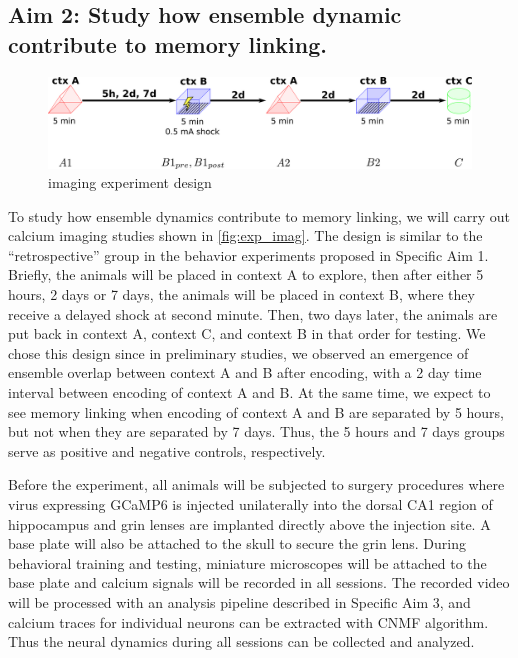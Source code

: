 \documentclass[master.tex]{subfiles}
\begin{document}
\subsection*{Aim 2: Study how ensemble dynamic contribute to memory linking.}

\begin{figure}[!hbt]
  \centering \includegraphics[scale = .135]{Figures/exp_imag.pdf}
  \caption{\footnotesize imaging experiment design}
  \label{fig:exp_imag}
\end{figure}

To study how ensemble dynamics contribute to memory linking, we will carry out
calcium imaging studies shown in \autoref{fig:exp_imag}. The design is similar
to the ``retrospective'' group in the behavior experiments proposed in Specific
Aim 1. Briefly, the animals will be placed in context A to explore, then after
either 5 hours, 2 days or 7 days, the animals will be placed in context B, where
they receive a delayed shock at second minute. Then, two days later, the animals
are put back in context A, context C, and context B in that order for testing.
We chose this design since in preliminary studies, we observed an emergence of
ensemble overlap between context A and B after encoding, with a 2 day time
interval between encoding of context A and B. At the same time, we expect to see
memory linking when encoding of context A and B are separated by 5 hours, but
not when they are separated by 7 days. Thus, the 5 hours and 7 days groups serve
as positive and negative controls, respectively.

Before the experiment, all animals will be subjected to surgery procedures where
virus expressing GCaMP6 is injected unilaterally into the dorsal CA1 region of
hippocampus and grin lenses are implanted directly above the injection site. A
base plate will also be attached to the skull to secure the grin lens. During
behavioral training and testing, miniature microscopes will be attached to the
base plate and calcium signals will be recorded in all sessions. The recorded
video will be processed with an analysis pipeline described in Specific Aim 3,
and calcium traces for individual neurons can be extracted with CNMF algorithm.
Thus the neural dynamics during all sessions can be collected and analyzed.
\end{document}
